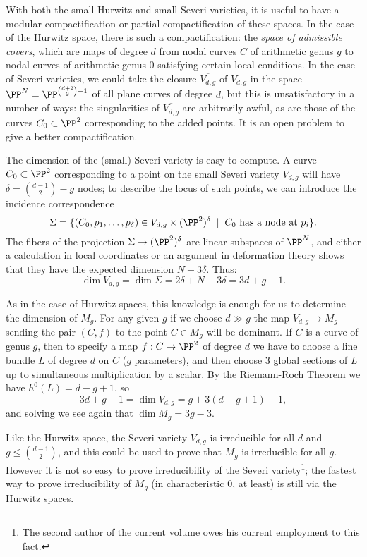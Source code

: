 With both the small Hurwitz and small Severi varieties, it is useful to have a modular compactification or partial compactification of these spaces. In the case of the Hurwitz space, there is such a compactification: the \emph{space of admissible covers}, which are  maps of degree $d$ from nodal curves $C$ of arithmetic genus $g$ to nodal curves of arithmetic genus 0 satisfying certain local conditions. In the case of Severi varieties, we could take the closure $\overline{V_{d,g}}$ of $V_{d,g}$ in the space $\PP^N = \PP^{\binom{d+2}{2}-1}$ of all plane curves of degree $d$, but this is unsatisfactory in a number of ways: the singularities of $\overline{V_{d,g}}$ are arbitrarily awful, as are those of the curves $C_0 \subset \PP^2$ corresponding to the added points. It is an open problem to give a better compactification.


The dimension of the (small) Severi variety is easy to compute. A curve $C_0 \subset \PP^2$ corresponding to a point on the small Severi variety $V_{d,g}$ will have $\delta = \binom{d-1}{2} - g$ nodes; to describe the locus of such points, we can introduce the incidence correspondence
$$
\Sigma = \{(C_0,p_1,\dots,p_\delta) \in V_{d,g} \times (\PP^2)^\delta \; \mid \; C_0 \text{ has a node at $p_i$} \}.
$$
The fibers of the projection $\Sigma \to (\PP^2)^\delta$ are linear subspaces of $\PP^N$, and either a calculation in local coordinates or an argument in deformation theory shows that they have the expected dimension $N - 3\delta$. Thus:
$$
\dim V_{d,g} = \dim \Sigma = 2\delta + N - 3\delta = 3d+g-1.
$$


As in the case of Hurwitz spaces, this knowledge is enough for us to determine the dimension of $M_g$. For any given $g$ if we choose $d \gg g$ the map $V_{d,g} \to M_g$ sending the pair $(C, f)$ to the point $C \in M_g$ will be dominant. If $C$ is a curve of genus $g$, then  to specify a map $f : C \to \PP^2$ of degree $d$ we have to choose a line bundle $L$ of degree $d$ on $C$ ($g$ parameters), and then choose 3 global sections of $L$ up to simultaneous multiplication by a scalar. By the Riemann-Roch Theorem we have $h^0(L) = d-g+1$, so
$$
3d+g-1 = \dim V_{d,g}  = g + 3(d-g+1) - 1,
$$
and solving we see again that $\dim M_g = 3g-3$.

Like the Hurwitz space, the Severi variety $V_{d,g}$ is irreducible for all $d$ and $g\leq \binom{d-1}{2}$, and this could be used to prove that $M_g$ is irreducible for all $g$. However it is not so easy to prove irreducibility of the Severi variety\footnote{The second author of the current volume owes his current employment to this fact.}; the fastest way to prove irreducibility of $M_g$ (in characteristic 0, at least) is still via the Hurwitz spaces.

